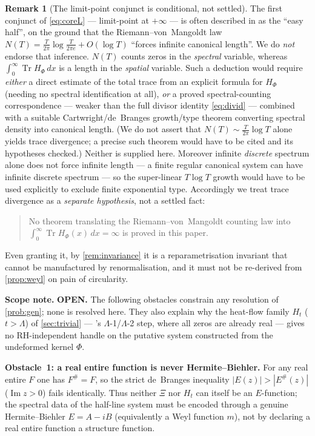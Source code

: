 \documentclass[12pt,a4paper]{amsart}
\theoremstyle{plain}
\theoremstyle{definition}
\newtheorem{remark}[theorem]{Remark}
\newcommand{\Tr}{\operatorname{Tr}}
\newcommand{\Ham}{H}
\newcommand{\scopenote}[1]{\par\smallskip\noindent\textbf{Scope note.} #1\par\smallskip}
\begin{document}
\begin{remark}[The limit-point conjunct is conditional, not settled]\label{rem:length}
  The first conjunct of \cref{eq:coreL} --- limit-point at $+\infty$ ---
  is often described in \cite{SpecRoadmap} as the ``easy half'', on the
  ground that the Riemann--von~Mangoldt law
  $N(T)=\tfrac{T}{2\pi}\log\tfrac{T}{2\pi e}+O(\log T)$ ``forces infinite
  canonical length''.  We do \emph{not} endorse that inference.  $N(T)$
  counts zeros in the \emph{spectral} variable, whereas
  $\int_0^\infty\Tr\Ham_\Phi\,dx$ is a length in the \emph{spatial}
  variable.  Such a deduction would require \emph{either} a direct
  estimate of the total trace from an explicit formula for $\Ham_\Phi$
  (needing no spectral identification at all), \emph{or} a proved
  spectral-counting correspondence --- weaker than the full divisor
  identity \cref{eq:divid} --- combined with a suitable
  Cartwright/de~Branges growth/type theorem converting spectral density
  into canonical length.  (We do not assert that
  $N(T)\sim\tfrac{T}{2\pi}\log T$ alone yields trace divergence; a precise
  such theorem would have to be cited and its hypotheses checked.)
  Neither is supplied here.  Moreover infinite
  \emph{discrete} spectrum alone does not force infinite length --- a
  finite regular canonical system can have infinite discrete spectrum ---
  so the super-linear $T\log T$ growth would have to be used explicitly to
  exclude finite exponential type.  Accordingly we treat trace divergence
  as a \emph{separate hypothesis}, not a settled fact:
  \begin{quote}
    No theorem translating the Riemann--von~Mangoldt counting law into
    $\int_0^\infty\Tr\Ham_\Phi(x)\,dx=\infty$ is proved in this paper.
  \end{quote}
  Even granting it, by \cref{rem:invariance} it is a reparametrisation
  invariant that cannot be manufactured by renormalisation, and it must
  not be re-derived from \cref{prop:weyl} on pain of circularity.
\end{remark}

\scopenote{\textbf{OPEN.}  The following obstacles constrain any
resolution of \cref{prob:gen}; none is resolved here.  They also explain
why the heat-flow family $H_t$ ($t>\Lambda$) of \cref{sec:trivial} ---
\cite{SpecRoadmap}'s $\Lambda$-1/$\Lambda$-2 step, where all zeros are
already real --- gives no RH-independent handle on the putative system
constructed from the undeformed kernel $\Phi$.}

\medskip\noindent\textbf{Obstacle~1: a real entire function is never
Hermite--Biehler.}
For any real entire $F$ one has $F^\# = F$, so the strict de~Branges
inequality $|E(z)|>|E^\#(z)|$ ($\operatorname{Im}z>0$) fails identically.
Thus neither $\Xi$ nor $H_t$ can itself be an $E$-function; the spectral
data of the half-line system must be encoded through a genuine
Hermite--Biehler $E=A-iB$ (equivalently a Weyl function $m$), not by
declaring a real entire function a structure function.
\end{document}
